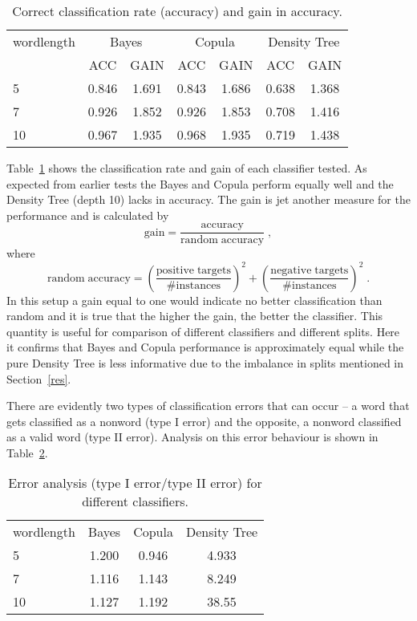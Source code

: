 \documentclass[draft]{article}
\begin{document}
\begin{table}[h]
	\centering
	\begin{tabular}{l c c c c c c }
		wordlength	& \multicolumn{2}{c}{Bayes} & \multicolumn{2}{c}{Copula}	& \multicolumn{2}{c}{Density Tree} 	\\
					& ACC		& GAIN			& ACC			& GAIN			& ACC			& GAIN				\\
		5			&	0.846	&	1.691		&	0.843		& 1.686			& 0.638 		& 1.368				\\
	 	7			&   0.926	&	1.852		&	0.926		& 1.853			& 0.708			& 1.416				\\
		10 			& 	0.967	&	1.935		&	0.968		& 1.935			& 0.719			& 1.438				\\
	\end{tabular}
	\caption{Correct classification rate (accuracy) and gain in accuracy.}
	\label{tab7}
\end{table}

Table~\ref{tab7} shows the classification rate and gain of each classifier tested.
As expected from earlier tests the Bayes and Copula perform equally well and the Density Tree (depth 10) lacks in
accuracy. The gain is jet another measure for the performance and is calculated by
$$ \mathrm{gain} = \frac{\mathrm{accuracy}}{\mathrm{random\; accuracy}} \; ,$$
where
$$ \mathrm{random\; accuracy}
= \left(\frac{\mathrm{positive\; targets}}{\mathrm{\# instances}}\right)^2 +
\left(\frac{\mathrm{negative\; targets}}{\mathrm{\# instances}}\right)^2 \; .$$
In this setup a gain equal to one would indicate no better classification than random and
it is true that the higher the gain, the better the classifier.
This quantity is useful for comparison of different classifiers
and different splits.
Here it confirms that Bayes and Copula performance is approximately equal
while the pure Density Tree is less informative due to the imbalance in splits mentioned
in Section~\ref{res}.
\newline

There are evidently two types of classification errors that can occur -- a word that gets classified
as a nonword (type I error) and the opposite, a nonword classified as a valid word (type II error).
Analysis on this error behaviour is shown in Table~\ref{tab8}.

\begin{table}[h]
	\centering
	\begin{tabular}{l c c c }
		wordlength	& Bayes		& Copula	& Density Tree	\\
		5			&	1.200	& 0.946		& 4.933			\\
	 	7			&   1.116	& 1.143		& 8.249			\\
		10 			& 	1.127	& 1.192		& 38.55			\\
	\end{tabular}
	\caption{Error analysis (type I error/type II error) for different classifiers.}
	\label{tab8}
\end{table}
\end{document}
